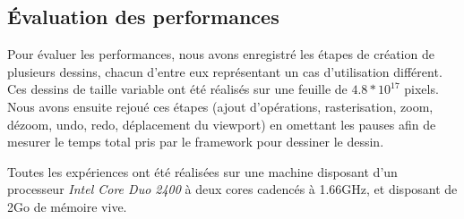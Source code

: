 		\subsection{Évaluation des performances}
			Pour évaluer les performances, nous avons enregistré les étapes de création de plusieurs dessins, chacun d'entre eux représentant
			un cas d'utilisation différent. Ces dessins de taille variable ont été réalisés sur une feuille de $4.8*10^{17}$ pixels. Nous avons 
			ensuite rejoué ces étapes (ajout d'opérations, rasterisation, zoom, dézoom, undo, redo,
			déplacement du viewport) en omettant les pauses afin de mesurer le temps total pris par le framework pour dessiner le dessin.
			
			Toutes les expériences ont été réalisées sur une machine disposant d'un processeur \emph{Intel Core Duo 2400} à deux cores cadencés
			à 1.66GHz, et disposant de 2Go de mémoire vive. 

